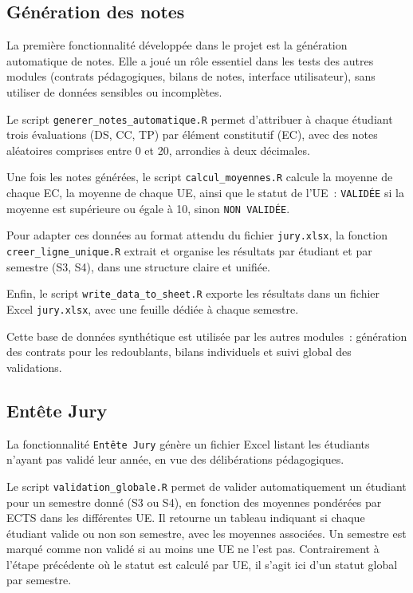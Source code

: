 \subsection{Génération des notes}
La première fonctionnalité développée dans le projet est la génération automatique de notes. Elle a joué un rôle essentiel dans les tests des autres modules (contrats pédagogiques, bilans de notes, interface utilisateur), sans utiliser de données sensibles ou incomplètes.

\vspace{0.5em}
Le script \texttt{generer\_notes\_automatique.R} permet d’attribuer à chaque étudiant trois évaluations (DS, CC, TP) par élément constitutif (EC), avec des notes aléatoires comprises entre 0 et 20, arrondies à deux décimales.

\vspace{0.5em}
Une fois les notes générées, le script \texttt{calcul\_moyennes.R} calcule la moyenne de chaque EC, la moyenne de chaque UE, ainsi que le statut de l’UE~: \texttt{VALIDÉE} si la moyenne est supérieure ou égale à 10, sinon \texttt{NON VALIDÉE}.

\vspace{0.5em}
Pour adapter ces données au format attendu du fichier \texttt{jury.xlsx}, la fonction \texttt{creer\_ligne\_unique.R} extrait et organise les résultats par étudiant et par semestre (S3, S4), dans une structure claire et unifiée.

\vspace{0.5em}
Enfin, le script \texttt{write\_data\_to\_sheet.R} exporte les résultats dans un fichier Excel \texttt{jury.xlsx}, avec une feuille dédiée à chaque semestre.

\vspace{0.5em}
Cette base de données synthétique est utilisée par les autres modules~: génération des contrats pour les redoublants, bilans individuels et suivi global des validations.

\subsection{Entête Jury}
La fonctionnalité \texttt{Entête Jury} génère un fichier Excel listant les étudiants n’ayant pas validé leur année, en vue des délibérations pédagogiques.

\vspace{0.5em}
Le script \texttt{validation\_globale.R} permet de valider automatiquement un étudiant pour un semestre donné (S3 ou S4), en fonction des moyennes pondérées par ECTS dans les différentes UE. Il retourne un tableau indiquant si chaque étudiant valide ou non son semestre, avec les moyennes associées. Un semestre est marqué comme non validé si au moins une UE ne l’est pas. Contrairement à l’étape précédente où le statut est calculé par UE, il s’agit ici d’un statut global par semestre.

